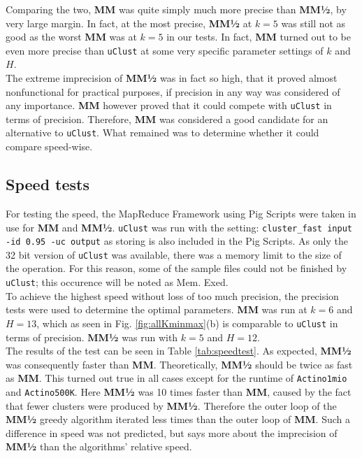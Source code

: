 \documentclass[../../main.tex]{subfiles}
\begin{document}
Comparing the two, {\bf MM} was quite simply much more precise than {\bf MM½}, by very large margin. In fact, at the most precise, {\bf MM½} at $k=5$ was still not as good as the worst {\bf MM} was at $k=5$ in our tests. In fact, {\bf MM} turned out to be even more precise than \texttt{uClust} at some very specific parameter settings of $k$ and $H$.\\

The extreme imprecision of {\bf MM½} was in fact so high, that it proved almost nonfunctional for practical purposes, if precision in any way was considered of any importance. {\bf MM} however proved that it could compete with \texttt{uClust} in terms of precision. Therefore, {\bf MM} was considered a good candidate for an alternative to \texttt{uClust}. What remained was to determine whether it could compare speed-wise.

\subsection{Speed tests}

For testing the speed, the MapReduce Framework using Pig Scripts were taken in use for {\bf MM} and {\bf MM½}. \texttt{uClust} was run with the setting: \texttt{cluster\_fast input -id 0.95 -uc output} as storing is also included in the Pig Scripts. As only the 32 bit version of \texttt{uClust} was available, there was a memory limit to the size of the operation. For this reason, some of the sample files could not be finished by \texttt{uClust}; this occurence will be noted as Mem. Exed.\\

To achieve the highest speed without loss of too much precision, the precision tests were used to determine the optimal parameters. {\bf MM} was run at $k=6$ and $H=13$, which as seen in Fig. \ref{fig:allKminmax}(b) is comparable to \texttt{uClust} in terms of precision. {\bf MM½} was run with $k=5$ and $H=12$.\\

The results of the test can be seen in Table \ref{tab:speedtest}. As expected, {\bf MM½} was consequently faster than {\bf MM}. Theoretically, {\bf MM½} should be twice as fast as {\bf MM}. This turned out true in all cases except for the runtime of \texttt{Actino1mio} and \texttt{Actino500K}. Here {\bf MM½} was 10 times faster than {\bf MM}, caused by the fact that fewer clusters were produced by {\bf MM½}. Therefore the outer loop of the {\bf MM½} greedy algorithm iterated less times than the outer loop of {\bf MM}. Such a difference in speed was not predicted, but says more about the imprecision of {\bf MM½} than the algorithms' relative speed.\\
\end{document}
